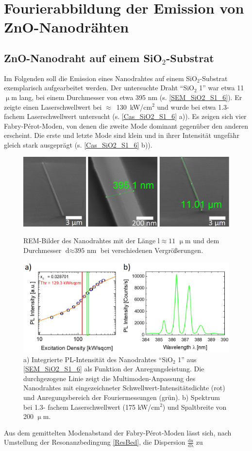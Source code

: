 \chapter{Fourierabbildung der Emission von ZnO-Nanodrähten}
\section{ZnO-Nanodraht auf einem SiO$_\text{2}$-Substrat}
Im Folgenden soll die Emission eines Nanodrahtes auf einem SiO$_\text{2}$-Substrat exemplarisch aufgearbeitet werden. Der untersuchte Draht ``SiO$_\text{2}$ 1'' war etwa 11 $\upmu$m lang, bei einem Durchmesser von etwa 395 nm (s. \autoref{SEM_SiO2_S1_6}). Er zeigte einen Laserschwellwert bei \mbox{$\approx$ 130 kW/cm$^\text{2}$} und wurde bei etwa 1.3-fachem Laserschwellwert untersucht (s. \autoref{Cas_SiO2_S1_6} a)). Es zeigen sich vier Fabry-Pérot-Moden, von denen die zweite Mode dominant gegenüber den anderen erscheint. Die erste und letzte Mode sind klein und in ihrer Intensität ungefähr gleich stark ausgeprägt (s. \autoref{Cas_SiO2_S1_6} b)).\begin{figure}[h]
\centering
\includegraphics[width=.6\textwidth]{Bilder/SiO2/SEM_SiO2_S1_6}
\caption{REM-Bilder des Nanodrahtes mit der Länge \mbox{$\text{l} \approx \text{11 }\upmu\text{m}$} und dem Durchmesser \mbox{$\text{d} \approx \text{395 nm}$} bei verschiedenen Vergrößerungen.}
\label{SEM_SiO2_S1_6}
\includegraphics[width=.6\textwidth]{Bilder/SiO2/Cas_SiO2_S1_6}
\caption{a) Integrierte PL-Intensität des Nanodrahtes ``SiO$_\text{2}$ 1'' aus \autoref{SEM_SiO2_S1_6} als Funktion der Anregungsleistung. Die durchgezogene Linie zeigt die Multimoden-Anpassung des Nanodrahtes mit eingezeichneter Schwellwert-Intensitätsdichte (rot) und Anregungsbereich der Fouriermessungen (grün). b) Spektrum bei 1.3- fachem Laserschwellwert (175 kW/cm$^\text{2}$) und Spaltbreite von 200 $\upmu$m.}
\label{Cas_SiO2_S1_6}
\end{figure}Aus dem gemittelten Modenabstand der Fabry-Pérot-Moden lässt sich, nach Umstellung der Resonanzbedingung \autoref{ResBed}, die Dispersion $\frac{\text{dn}}{\text{d}\uplambda}$ zu

